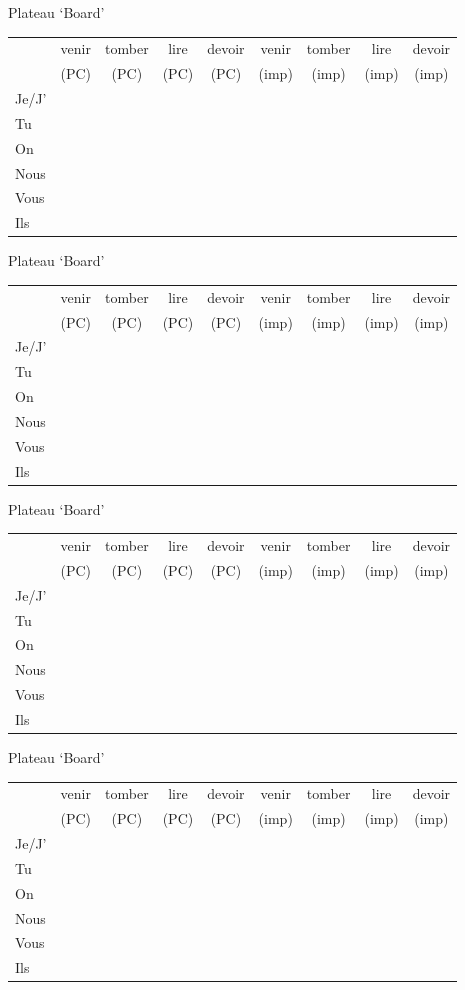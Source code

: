 \documentclass{article}
\date{}
\newcommand{\plateau}{
    \Large
    Plateau `Board' \\
    \begin{tabular}{| l | c | c | c | c | c | c | c | c |}
      \hline
                & venir & tomber & lire     & devoir & venir & tomber & lire  & devoir \\
                & (PC)  & (PC)   & (PC)     & (PC)   & (imp) & (imp)  & (imp) & (imp) \\
      \hline
      Je/J'     &       &        &          &        &       &        &       & \\
      \hline
      Tu        &       &        &          &        &       &        &       & \\
      \hline
      On        &       &        &          &        &       &        &       & \\
      \hline
      Nous      &       &        &          &        &       &        &       & \\
      \hline
      Vous      &       &        &          &        &       &        &       & \\
      \hline
      Ils       &       &        &          &        &       &        &       & \\
      \hline
    \end{tabular}
  }
\begin{document}
  \centering
  \noindent
  \plateau

  \plateau

  \plateau

  \plateau
\end{document}
